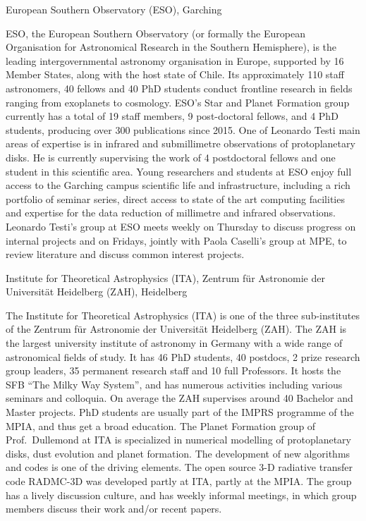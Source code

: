 \documentclass[10pt,fleqn,twoside,a4paper]{article}
\begin{document}
\begin{Emphasize}
European Southern Observatory (ESO), Garching\\
\end{Emphasize}
ESO, the European Southern Observatory (or formally the European
Organisation for Astronomical Research in the Southern Hemisphere), is the
leading intergovernmental astronomy organisation in Europe, supported by 16
Member States, along with the host state of Chile. Its approximately 110
staff astronomers, 40 fellows and 40 PhD students conduct frontline research
in fields ranging from exoplanets to cosmology. ESO’s Star and Planet
Formation group currently has a total of 19 staff members, 9 post-doctoral
fellows, and 4 PhD students, producing over 300 publications since 2015. One
of Leonardo Testi main areas of expertise is in infrared and submillimetre
observations of protoplanetary disks. He is currently supervising the work
of 4 postdoctoral fellows and one student in this scientific area. Young
researchers and students at ESO enjoy full access to the Garching campus
scientific life and infrastructure, including a rich portfolio of seminar
series, direct access to state of the art computing facilities and expertise
for the data reduction of millimetre and infrared observations. Leonardo
Testi’s group at ESO meets weekly on Thursday to discuss progress on
internal projects and on Fridays, jointly with Paola Caselli’s group at MPE,
to review literature and discuss common interest projects.
\vspace{1em}

\begin{Emphasize}
Institute for Theoretical Astrophysics (ITA), 
Zentrum f\"ur Astronomie der Universit\"at Heidelberg (ZAH), Heidelberg\\
\end{Emphasize}
The Institute for Theoretical Astrophysics (ITA) is one of the three
sub-institutes of the Zentrum f\"ur Astronomie der Universit\"at Heidelberg
(ZAH).  The ZAH is the largest university institute of astronomy in Germany
with a wide range of astronomical fields of study. It has 46 PhD students,
40 postdocs, 2 prize research group leaders, 35 permanent research staff and
10 full Professors. It hosts the SFB ``The Milky Way System'', and has 
numerous activities including various seminars and colloquia. On average
the ZAH supervises around 40 Bachelor and Master projects. PhD students 
are usually part of the IMPRS programme of the MPIA, and thus get a broad
education. The Planet Formation group of Prof.~Dullemond at ITA is specialized
in numerical modelling of protoplanetary disks, dust evolution and 
planet formation. The development of new algorithms and codes is one of the
driving elements. The open source 3-D radiative transfer code {\sc RADMC-3D}
was developed partly at ITA, partly at the MPIA. The group has a lively
discussion culture, and has weekly informal meetings, in which group members 
discuss their work and/or recent papers.
\vspace{1em}
\end{document}
